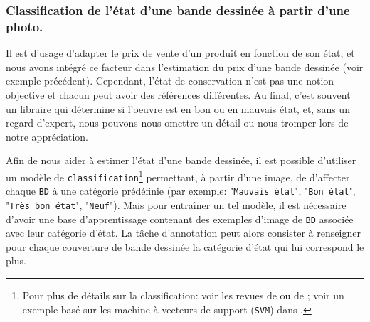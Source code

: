 		
		\subsubsection{Classification de l'état d'une bande dessinée à partir d'une photo.}
		\label{section:2.1.2.B-PRESENTATION-ANNOTATION-EXEMPLES-CLASSIFICATION}
			
			Il est d'usage d'adapter le prix de vente d'un produit en fonction de son état, et nous avons intégré ce facteur dans l'estimation du prix d'une bande dessinée (voir exemple précédent).
			Cependant, l'état de conservation n'est pas une notion objective et chacun peut avoir des références différentes.
			Au final, c'est souvent un libraire qui détermine si l'oeuvre est en bon ou en mauvais état, et, sans un regard d'expert, nous pouvons nous omettre un détail ou nous tromper lors de notre appréciation.
			
			Afin de nous aider à estimer l'état d'une bande dessinée, il est possible d'utiliser un modèle de \texttt{classification}\footnote{Pour plus de détails sur la classification: voir les revues de \cite{aized-amin-soofi-arshad-awan:2017:classification-techniques-machine} ou de \cite{kotsiantis-etal:2006:machine-learning-review} ; voir un exemple basé sur les machine à vecteurs de support (\texttt{SVM}) dans \cite{cortes-vapnik:1995:supportvector-networks}.} permettant, à partir d'une image, de d'affecter chaque \texttt{BD} à une catégorie prédéfinie (par exemple: "\texttt{Mauvais état}", "\texttt{Bon état}", "\texttt{Très bon état}", "\texttt{Neuf}").
			Mais pour entraîner un tel modèle, il est nécessaire d'avoir une base d'apprentissage contenant des exemples d'image de \texttt{BD} associée avec leur catégorie d'état.
			La tâche d'annotation peut alors consister à renseigner pour chaque couverture de bande dessinée la catégorie d'état qui lui correspond le plus.
			
